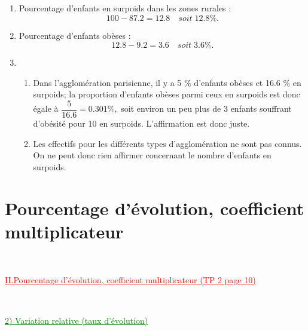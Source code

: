 \documentclass[xcolor={dvipsnames}]{beamer}
\begin{document}
\begin{frame}{}
\begin{enumerate}
	\item  Pourcentage d'enfants en surpoids dans les zones rurales :\pause
	\begin{equation*}
	\num{100} - \num{87.2} = \num{12.8} \quad soit \; \num{12.8} \%.
	\end{equation*}\pause
	
	 
	
	\item  Pourcentage d'enfants obèses :\pause
	\begin{equation*}
	\num{12.8} - \num{9.2} = \num{3.6} \quad soit \; \num{3.6} \%.
	\end{equation*}\pause
	
	\item \begin{enumerate}[a]
		\item Dans l'agglomération parisienne, il y a \num{5} \% d'enfants obèses et \num{16.6} \% en surpoids; la proportion d'enfants obèses parmi ceux en surpoids est donc égale à $\dfrac{5}{\num{16.6}}=\num{0.301} \%,$ soit environ un peu plus de 3 enfants souffrant d'obésité pour 10 en surpoids. L'affirmation est donc juste.
		
		\item Les effectifs pour les différents types d'agglomération ne sont pas connus. On ne peut donc rien affirmer concernant le nombre d'enfants en surpoids.
	\end{enumerate}
	
	
\end{enumerate}
\end{frame}

\section{Pourcentage d'évolution, coefficient multiplicateur}

\begin{frame}
\

\begin{Large}
	\textcolor{Red}{\underline{II.Pourcentage d'évolution, coefficient multiplicateur (TP 2 page 10)}}
\end{Large}\pause
\

\vspace*{1cm}

\textcolor{Green}{\underline{2) Variation relative (taux d'évolution)}}
\end{frame}
\end{document}
